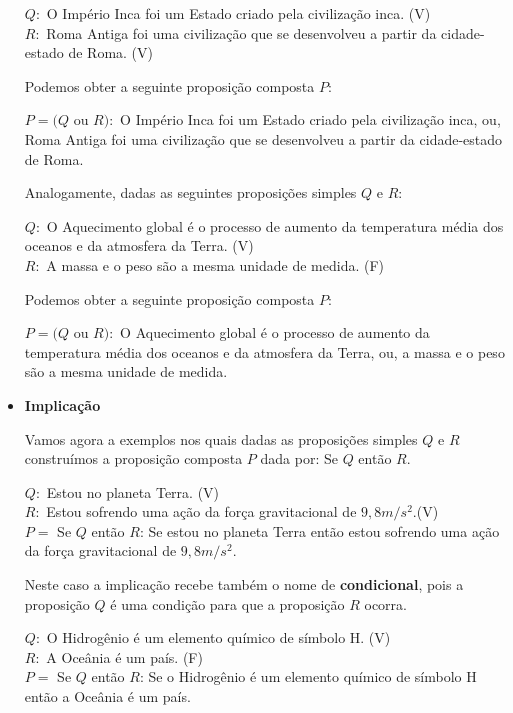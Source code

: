 \begin{itemize}
\begin{exem}
 $Q:$ O Império Inca foi um Estado criado pela civilização inca. (V) \\
 $R:$ Roma Antiga foi uma civilização que se desenvolveu a partir da cidade-estado de Roma. (V)

 Podemos obter a seguinte proposição composta $P$:

 $P= (Q$ ou $R):$ O Império Inca foi um Estado criado pela civilização inca, ou, Roma Antiga foi uma civilização que se desenvolveu a partir da cidade-estado de Roma.
 \end{exem}

 \begin{exem} \label{(Ou 3)}
 Analogamente, dadas as seguintes proposições simples $Q$ e $R$:

 $Q:$ O Aquecimento global é o processo de aumento da temperatura média dos oceanos e da atmosfera da Terra. (V) \\
 $R:$ A massa e o peso são a mesma unidade de medida. (F)

 Podemos obter a seguinte proposição composta $P$:

 $P= (Q$ ou $R):$ O Aquecimento global é o processo de aumento da temperatura média dos oceanos e da atmosfera da Terra, ou, a massa e o peso são a mesma unidade de medida.
 \end{exem}


 \item \textbf{Implicação}

 Vamos agora a exemplos nos quais dadas as proposições simples $Q$ e $R$ construímos a proposição composta $P$ dada por: Se $Q$ então $R$.

  \begin{exem} \label{(Se 1)}
 $Q:$ Estou no planeta Terra. (V) \\
 $R:$ Estou sofrendo uma ação da força gravitacional de $9,8 m/s^2$.(V) \\
 $P=$ Se $Q$ então $R$: Se estou no planeta Terra então estou sofrendo uma ação da força gravitacional de $9,8 m/s^2$.

 Neste caso a implicação recebe também o nome de \textbf{condicional}, pois a proposição $Q$ é uma condição para que a proposição $R$ ocorra.\end{exem}

 \begin{exem} \label{(Se 2)}
 $Q:$ O Hidrogênio é um elemento químico de símbolo H. (V) \\
 $R:$ A Oceânia é um país. (F) \\
 $P=$ Se $Q$ então $R$: Se o Hidrogênio é um elemento químico de símbolo H então a Oceânia é um país.
 \end{exem}


\end{itemize}
